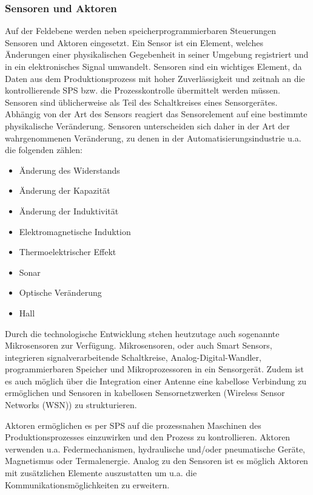 \subsubsection{Sensoren und Aktoren}
Auf der Feldebene werden neben speicherprogrammierbaren Steuerungen Sensoren und Aktoren eingesetzt. 
Ein Sensor ist ein Element, welches Änderungen einer physikalischen Gegebenheit in seiner Umgebung registriert und in ein elektronisches Signal umwandelt. Sensoren sind ein wichtiges Element, da Daten aus dem Produktionsprozess mit hoher Zuverlässigkeit und zeitnah an die kontrollierende SPS bzw. die Prozesskontrolle übermittelt werden müssen. Sensoren sind üblicherweise als Teil des Schaltkreises eines Sensorgerätes. Abhängig von der Art des Sensors reagiert das Sensorelement auf eine bestimmte physikalische Veränderung. Sensoren unterscheiden sich daher in der Art der wahrgenommenen  Veränderung, zu denen in der Automatisierungsindustrie u.a. die folgenden zählen:
\begin{itemize}
\item Änderung des Widerstands
\item Änderung der Kapazität
\item Änderung der Induktivität
\item Elektromagnetische Induktion
\item Thermoelektrischer Effekt
\item Sonar
\item Optische Veränderung
\item Hall
\end{itemize}

Durch die technologische Entwicklung stehen heutzutage auch sogenannte Mikrosensoren zur Verfügung. Mikrosensoren, oder auch \glqq Smart Sensors\grqq , integrieren signalverarbeitende Schaltkreise, Analog-Digital-Wandler, programmierbaren Speicher und Mikroprozessoren in ein Sensorgerät. Zudem ist es auch möglich über die Integration einer Antenne eine kabellose Verbindung zu ermöglichen und Sensoren in kabellosen Sensornetzwerken (Wireless Sensor Networks (WSN)) zu strukturieren.

Aktoren ermöglichen es per SPS auf die prozessnahen Maschinen des Produktionsprozesses einzuwirken und den Prozess zu kontrollieren. Aktoren verwenden u.a. Federmechanismen, hydraulische und/oder pneumatische Geräte, Magnetismus oder Termalenergie. Analog zu den Sensoren ist es möglich Aktoren mit zusätzlichen Elemente auszustatten um u.a. die Kommunikationsmöglichkeiten zu erweitern.

